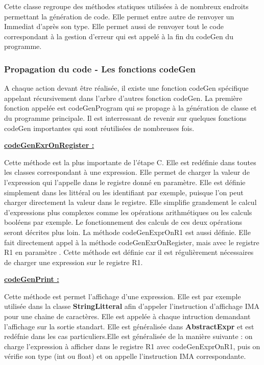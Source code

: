 \documentclass[12pt, a4paper, one side]{article}
\begin{document}
    Cette classe regroupe des méthodes statiques utilisées à de nombreux
    endroits permettant la génération
    de code. Elle permet entre autre de renvoyer un Immediat d'après son type.
    Elle permet aussi de renvoyer tout
    le code correspondant à la gestion d'erreur qui est appelé à la fin du codeGen
    du programme.

    \subsubsection{Propagation du code - Les fonctions codeGen}

    A chaque action devant être réalisée, il existe une fonction codeGen
    spécifique appelant récursivement dans l'arbre
    d'autres fonction codeGen. La première fonction appelée est codeGenProgram
    qui se propage à la génération de classe
    et du programme principale. Il est interressant de revenir sur quelques
    fonctions codeGen importantes qui sont réutilisées
    de nombreuses fois.

    \medskip
    \textbf{\underline{codeGenExrOnRegister :}}

    Cette méthode est la plus importante de l'étape C. Elle est redéfinie dans
    toutes les classes correspondant à une expression. Elle permet de charger
    la valeur de l'expression qui l'appelle dans le registre donné en paramètre.
    Elle est définie simplement dans les littéral ou les identifiant par
    exemple, puisque l'on peut charger directement la valeur dans le registre.
    Elle simplifie grandement le calcul d'expressions plus complexes comme
    les opérations arithmétiques ou les calculs booléens par exemple. Le
    fonctionnement
    des calculs de ces deux opérations seront décrites plus loin. La méthode
    codeGenExprOnR1 est aussi définie. Elle fait directement appel à la méthode
    codeGenExrOnRegister, mais avec le registre R1 en paramètre . Cette méthode
    est définie car il est régulièrement nécessaires de charger une expression
    sur le registre R1.

    \medskip
    \textbf{\underline{codeGenPrint :}}

    Cette méthode est permet l'affichage d'une expression. Elle est par exemple
    utilisée dans la classe \textbf{StringLitteral} afin d'appeler l'instruction
    d'affichage IMA pour une chaine de caractères. Elle est appelée à chaque
    intruction demandant l'affichage sur la sortie standart. Elle est
    généralisée dans \textbf{AbstractExpr} et est redéfnie dans les cas
    particuliers.Elle est généralisée de la manière suivante : on charge
    l'expression à afficher dans le registre R1 avec codeGenExprOnR1, puis
    on vérifie son type (int ou float) et on appelle l'instruction IMA
    correspondante.
\end{document}
